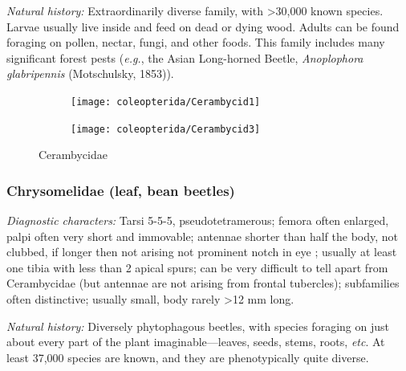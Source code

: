 \noindent{}\textit{Natural history:} Extraordinarily diverse family, with \textgreater30,000 known species. Larvae usually live inside and feed on dead or dying wood. Adults can be found foraging on pollen, nectar, fungi, and other foods. This family includes many significant forest pests (\textit{e.g.}, the Asian Long-horned Beetle, \textit{Anoplophora glabripennis} (Motschulsky, 1853)).

\begin{figure}[ht!]%
  \centering
\begin{subfigure}[ht!]{0.44\textwidth}
    \texttt{[image: coleopterida/Cerambycid1]}
  \caption{}
  \label{fig:cerambycid1}
\end{subfigure}
\hfill
\begin{subfigure}[ht!]{0.47\textwidth}
    \texttt{[image: coleopterida/Cerambycid3]}
  \caption{}
  \label{fig:cerambycid3}
\end{subfigure}
    \caption{Cerambycidae \citep[modified from][Plates II-III, Fig. 7]{bhlitem103087}}\label{fig:cerambycids}
\end{figure}

\subsubsection{Chrysomelidae (leaf, bean beetles)}
\noindent{}\textit{Diagnostic characters:} Tarsi 5-5-5, pseudotetramerous; femora often enlarged, palpi often very short and immovable; antennae shorter than half the body, not clubbed, if longer then not arising not prominent notch in eye ; usually at least one tibia with less than 2 apical spurs; can be very difficult to tell apart from Cerambycidae (but antennae are not arising from frontal tubercles); subfamilies often distinctive; usually small, body rarely \textgreater12 mm long.\vspace{3mm}

\noindent{}\textit{Natural history:} Diversely phytophagous beetles, with species foraging on just about every part of the plant imaginable---leaves, seeds, stems, roots, \textit{etc}. At least 37,000 species are known, and they are phenotypically quite diverse.

